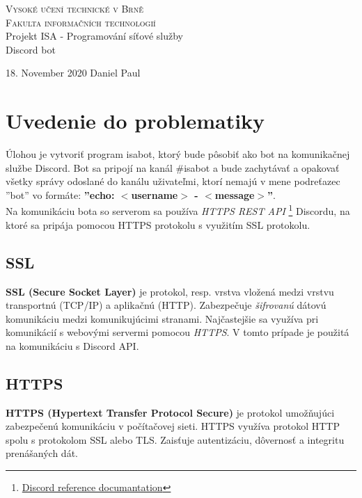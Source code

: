 \documentclass[11pt,a4paper]{article}
\begin{document}
\nocite{*}
	\begin{titlepage}

		\begin{center}

			 \textsc{\Huge {Vysoké učení technické v Brně}} \\
			\textsc{\huge {Fakulta informačních technologií}}\\
			{\LARGE Projekt ISA - Programování síťové služby} \\ [0.25 cm]
			{\Huge Discord bot }\\ 	
		\end{center}

	{\Large 18. November 2020 \hspace{90mm} Daniel Paul}		

	\end{titlepage}

	\tableofcontents
	\newpage
	
	\section{Uvedenie do problematiky}
	Úlohou je vytvoriť program isabot, ktorý bude pôsobiť ako bot na komunikačnej službe Discord.
	Bot sa pripojí na kanál \#isabot a bude zachytávať a opakovať všetky správy odoslané do kanálu uživateľmi, ktorí nemajú v mene podreťazec ''bot'' vo formáte: \textbf{''echo: $<$username$>$ - $<$message$>$''}.\\
	Na komunikáciu bota so serverom sa používa \emph{HTTPS REST API} \footnote{\href{https://discord.com/developers/docs/reference}{Discord reference documantation}} Discordu, na ktoré sa pripája pomocou HTTPS protokolu s využitím SSL protokolu.
	\subsection{SSL}
	\textbf{SSL (Secure Socket Layer)} je protokol, resp. vrstva vložená medzi vrstvu transportnú (TCP/IP) a aplikačnú (HTTP). Zabezpečuje \emph{šifrovanú} dátovú komunikáciu medzi komunikujúcimi stranami. Najčastejšie sa využíva pri komunikácií s webovými servermi pomocou \emph{HTTPS}. V tomto prípade je použitá na komunikáciu s Discord API.
	\subsection{HTTPS}
	\textbf{HTTPS (Hypertext Transfer Protocol Secure)} je protokol umožňujúci zabezpečenú komunikáciu v počítačovej sieti. HTTPS využíva protokol HTTP spolu s protokolom SSL alebo TLS. Zaisťuje autentizáciu, dôvernosť a integritu prenášaných dát.
\end{document}
